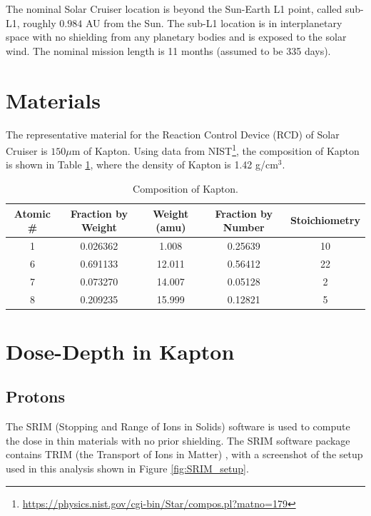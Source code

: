 \documentclass{hitec}
\begin{document}
The nominal Solar Cruiser location is beyond the Sun-Earth L1 point, called sub-L1, roughly $0.984$ AU from the Sun. The sub-L1 location is in interplanetary space with no shielding from any planetary bodies and is exposed to the solar wind. The nominal mission length is 11 months (assumed to be 335 days).

\section{Materials}
\label{sec:Materials}
The representative material for the Reaction Control Device (RCD) of Solar Cruiser is $150 \mu\text{m}$ of Kapton. Using data from NIST\footnote{\url{https://physics.nist.gov/cgi-bin/Star/compos.pl?matno=179}}, the composition of Kapton is shown in Table \ref{tab:Kapton_composition}, where the density of Kapton is 1.42 g/cm$^3$.

\begin{table}[!h]\centering
	\caption{Composition of Kapton.}\label{tab:Kapton_composition}
	\begin{tabular}{|c | c | c | c | c |}\hline
		Atomic \# & Fraction by Weight & Weight (amu) & Fraction by Number & Stoichiometry\\\hline
		1	& 0.026362	&  1.008 & 0.25639 & 10\\\hline
		6	& 0.691133	& 12.011 & 0.56412 & 22\\\hline
		7	& 0.073270	& 14.007 & 0.05128 &  2\\\hline
		8	& 0.209235	& 15.999 & 0.12821 &  5\\\hline	
	\end{tabular}
\end{table}

\section{Dose-Depth in Kapton}

\subsection{Protons}

The SRIM (Stopping and Range of Ions in Solids) software is used to compute the dose in thin materials with no prior shielding. The SRIM software package contains TRIM (the Transport of Ions in Matter) \citep{ziegler2004srim, ziegler2010srim}, with a screenshot of the setup used in this analysis shown in Figure \ref{fig:SRIM_setup}.
\end{document}
